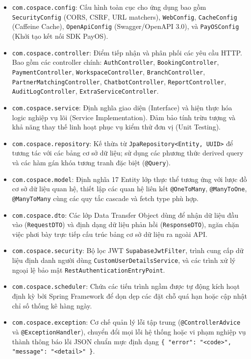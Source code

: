 \begin{itemize}
    \item \texttt{com.cospace.config}: Cấu hình toàn cục cho ứng dụng bao gồm \texttt{SecurityConfig} (CORS, CSRF, URL matchers), \texttt{WebConfig}, \texttt{CacheConfig} (Caffeine Cache), \texttt{OpenApiConfig} (Swagger/OpenAPI 3.0), và \texttt{PayOSConfig} (Khởi tạo kết nối SDK PayOS).
    \item \texttt{com.cospace.controller}: Điểm tiếp nhận và phân phối các yêu cầu HTTP. Bao gồm các controller chính: \texttt{AuthController}, \texttt{BookingController}, \texttt{PaymentController}, \texttt{WorkspaceController}, \texttt{BranchController}, \texttt{PartnerMatchingController}, \texttt{ChatbotController}, \texttt{ReportController}, \texttt{AuditLogController}, \texttt{ExtraServiceController}.
    \item \texttt{com.cospace.service}: Định nghĩa giao diện (Interface) và hiện thực hóa logic nghiệp vụ lõi (Service Implementation). Đảm bảo tính trừu tượng và khả năng thay thế linh hoạt phục vụ kiểm thử đơn vị (Unit Testing).
    \item \texttt{com.cospace.repository}: Kế thừa từ \texttt{JpaRepository<Entity, UUID>} để tương tác với các bảng cơ sở dữ liệu; sử dụng các phương thức derived query và các hàm gán khóa tương tranh đặc biệt (\texttt{@Query}).
    \item \texttt{com.cospace.model}: Định nghĩa 17 Entity lớp thực thể tương ứng với lược đồ cơ sở dữ liệu quan hệ, thiết lập các quan hệ liên kết \texttt{@OneToMany}, \texttt{@ManyToOne}, \texttt{@ManyToMany} cùng các quy tắc cascade và fetch type phù hợp.
    \item \texttt{com.cospace.dto}: Các lớp Data Transfer Object dùng để nhận dữ liệu đầu vào (\texttt{RequestDTO}) và định dạng dữ liệu phản hồi (\texttt{ResponseDTO}), ngăn chặn việc phơi bày trực tiếp cấu trúc bảng cơ sở dữ liệu ra ngoài API.
    \item \texttt{com.cospace.security}: Bộ lọc JWT \texttt{SupabaseJwtFilter}, trình cung cấp dữ liệu định danh người dùng \texttt{CustomUserDetailsService}, và các trình xử lý ngoại lệ bảo mật \texttt{RestAuthenticationEntryPoint}.
    \item \texttt{com.cospace.scheduler}: Chứa các tiến trình ngầm được tự động kích hoạt định kỳ bởi Spring Framework để dọn dẹp các đặt chỗ quá hạn hoặc cập nhật chỉ số thống kê hàng ngày.
    \item \texttt{com.cospace.exception}: Cơ chế quản lý lỗi tập trung (\texttt{@ControllerAdvice} và \texttt{@ExceptionHandler}), chuyển đổi mọi lỗi hệ thống hoặc vi phạm nghiệp vụ thành thông báo lỗi JSON chuẩn mực định dạng \texttt{\{ "error": "<code>", "message": "<detail>" \}}.
\end{itemize}